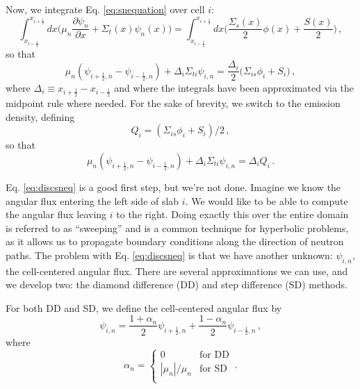 Now, we integrate Eq. \ref{eq:snequation} over cell $i$:
\begin{equation}
  \int^{x_{i+\frac{1}{2}}}_{x_{i-\frac{1}{2}}} dx \Big ( \mu_n \frac{\partial \psi_n}{\partial x} + \Sigma_t(x)\psi_n(x) \Big ) =  \int^{x_{i+\frac{1}{2}}}_{x_{i-\frac{1}{2}}} dx  \Big ( \frac{\Sigma_s(x)}{2} \phi(x) + \frac{S(x)}{2} \Big ) \, ,
\end{equation}
so that
\begin{equation}
   \mu_n ( \psi_{i+\frac{1}{2},n} - \psi_{i-\frac{1}{2},n} ) + \Delta_i \Sigma_{ti}\psi_{i,n} =  \frac{\Delta_i}{2} \Big ( \Sigma_{is} \phi_i +  S_i \Big ) \, ,
\end{equation}
where $\Delta_i \equiv x_{i+\frac{1}{2}} - x_{i-\frac{1}{2}}$ and where the integrals have been approximated via the midpoint rule where needed.  For the sake of brevity, we switch to the emission density, defining
\begin{equation}
 Q_i =  (\Sigma_{is} \phi_i +  S_i)/2 \, ,
\end{equation}
so that
\begin{equation}
   \mu_n ( \psi_{i+\frac{1}{2},n} - \psi_{i-\frac{1}{2},n} ) + \Delta_i \Sigma_{ti}\psi_{i,n} =  \Delta_i Q_i \, .
   \label{eq:discsneq}
\end{equation}

Eq. \ref{eq:discsneq} is a good first step, but we're not done.  Imagine we know the angular flux entering the left side of slab $i$.  We would like to be able to compute the angular flux leaving $i$ to the right.  Doing exactly this over the entire domain is referred to as ``sweeping'' and is a common technique for hyperbolic problems, as it allows us to propagate boundary conditions along the direction of neutron paths.  The problem with Eq. \ref{eq:discsneq} is that we have another unknown: $\psi_{i,n}$, the cell-centered angular flux.  There are several approximations we can use, and we develop two: the diamond difference (DD) and step difference (SD) methods.

For both DD and SD, we define the cell-centered angular flux by
\begin{equation}
 \psi_{i,n} = \frac{1+\alpha_n}{2} \psi_{i+\frac{1}{2},n} + \frac{1-\alpha_n}{2} \psi_{i-\frac{1}{2},n}  \, ,
 \label{eq:ccpsi}
\end{equation}
where
\begin{equation}
 \alpha_n =
 \begin{cases} 0             &   \text{for DD}  \\
               |\mu_n|/\mu_n &   \text{for SD}  \\
 \end{cases} \, .
 \label{eq:sn_alpha}
\end{equation}

